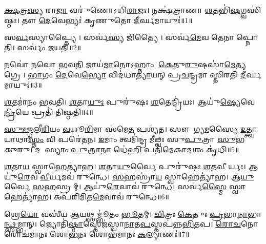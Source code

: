 
\ul{𑌕𑍍𑌷}𑌤𑍍𑌰\ul{𑌸𑍍𑌯} 𑌰𑌾\ul{𑌜𑌾} 𑌵𑌰𑍁॑𑌣𑍋𑌽𑌧𑌿\ul{𑌰𑌾}𑌜𑌃। 𑌨𑌕𑍍𑌷॑𑌤𑍍𑌰𑌾𑌣𑌾 \ul{𑌶}𑌤𑌭𑌿॑\ul{𑌷}𑌗𑍍𑌵𑌸𑌿॑𑌷𑍍𑌠𑌃। 𑌤𑍗 \ul{𑌦𑍇}𑌵𑍇𑌭𑍍𑌯𑌃॑ 𑌕𑍃𑌣𑍁𑌤𑍋 \ul{𑌦𑍀}𑌰𑍍𑌘𑌮𑌾𑌯𑍁𑌃॑॥1॥

𑌸\ul{𑌰𑍍𑌵}𑌸𑍍𑌯𑌾𑌪𑍍𑌤𑍍𑌯𑍈। 𑌸𑌰𑍍𑌵॑\ul{𑌸𑍍𑌯} 𑌜𑌿𑌤𑍍𑌯𑍈। 𑌸𑌰𑍍𑌵॑\ul{𑌮𑍇}𑌵 𑌤𑍇𑌨𑌾𑌪𑍍𑌨𑍋𑌤𑌿। 𑌸𑌰𑍍𑌵𑌂॑ 𑌜𑌯𑌤𑌿॥2॥

𑌨𑌵𑍋॑ 𑌨𑌵𑍋 𑌭𑌵\ul{𑌤𑌿} 𑌜𑌾𑌯॑\ul{𑌮𑌾}𑌨𑍋𑌽𑌹𑍍𑌨𑌾𑌂 \ul{𑌕𑍇}𑌤𑍁\ul{𑌰𑍁}𑌷𑌸𑌾॑\ul{𑌮𑍇}𑌤𑍍𑌯𑌗𑍍𑌰𑍇।
\ul{𑌭𑌾}𑌗𑌂 \ul{𑌦𑍇}𑌵𑍇\ul{𑌭𑍍𑌯𑍋} 𑌵𑌿𑌦॑𑌧𑌾\ul{𑌤𑍍𑌯𑌾}𑌯𑌨𑍍 𑌪𑍍𑌰\ul{𑌚}𑌨𑍍𑌦𑍍𑌰𑌮𑌾𑌸𑍍𑌤𑌿𑌰𑌤𑌿 \ul{𑌦𑍀}𑌰𑍍𑌘𑌮𑌾𑌯𑍁𑌃॑॥3॥

\ul{𑌶}𑌤𑌮𑌾॑𑌨𑌂 𑌭𑌵𑌤𑌿। \ul{𑌶}𑌤𑌾\ul{𑌯𑍁𑌃} 𑌪𑍁𑌰𑍁॑𑌷𑌃 \ul{𑌶}𑌤𑍇𑌨𑍍𑌦𑍍𑌰𑌿॑𑌯𑌃। 𑌆𑌯𑍁॑\ul{𑌷𑍍𑌯𑍇}𑌵𑍇\ul{𑌨𑍍𑌦𑍍𑌰𑌿}𑌯𑍇 𑌪𑍍𑌰𑌤𑌿॑ 𑌤𑌿𑌷𑍍𑌠𑌤𑌿॥4॥

\ul{𑌸𑍁}\ul{𑌮}\ul{𑌙𑍍𑌗}𑌲𑍀\ul{𑌰𑌿}𑌯𑌂 \ul{𑌵}𑌧𑍂\ul{𑌰𑌿}𑌮𑌾 𑌸॑𑌮𑍇\ul{𑌤} 𑌪𑌶𑍍𑌯॑𑌤। 
𑌸𑍗𑌭𑌾᳚𑌗𑍍𑌯\ul{𑌮}𑌸𑍍𑌯𑍈 \ul{𑌦}𑌤𑍍𑌤𑍍𑌵𑌾𑌯𑌾𑌥𑌾\ul{𑌸𑍍𑌤𑌂} 𑌵𑌿 𑌪𑌰𑍇॑𑌤𑌨। 
\ul{𑌇}𑌮𑌾𑌂 𑌤𑍍𑌵𑌮𑌿॑𑌨𑍍𑌦𑍍𑌰 𑌮𑍀𑌢𑍍𑌵𑌃 𑌸𑍁\ul{𑌪𑍁}𑌤𑍍𑌰𑌾 \ul{𑌸𑍁}𑌭𑌗𑌾𑌂᳚ 𑌕𑍁𑌰𑍁। 
𑌦𑌶𑌾᳚𑌸𑍍𑌯𑌾𑌂 \ul{𑌪𑍁}𑌤𑍍𑌰𑌾𑌨𑌾 𑌧𑍇॑\ul{𑌹𑌿} 𑌪𑌤𑌿॑𑌮𑍇𑌕𑌾\ul{𑌦}𑌶𑌂 𑌕𑍃॑𑌧𑌿॥5॥ 


\ul{𑌶}𑌤𑌾\ul{𑌯} 𑌸𑍍𑌵𑌾𑌹𑍇𑌤𑍍𑌯𑌾॑𑌹। \ul{𑌶}𑌤𑌾\ul{𑌯𑍁}𑌰𑍍𑌵𑍈 𑌪𑍁𑌰𑍁॑𑌷𑌃 \ul{𑌶}𑌤𑌵𑍀𑌰𑍍𑌯𑌃। 𑌆𑌯𑍁॑\ul{𑌰𑍇}𑌵 \ul{𑌵𑍀}𑌰𑍍𑌯॑𑌮𑌵॑ 𑌰𑍁𑌨𑍍𑌧𑍇। \ul{𑌸}𑌹𑌸𑍍𑌰𑌾॑\ul{𑌯} 𑌸𑍍𑌵𑌾𑌹𑍇𑌤𑍍𑌯𑌾॑𑌹। 𑌆\ul{𑌯𑍁}𑌰𑍍𑌵𑍈 \ul{𑌸}𑌹𑌸𑍍𑌰𑌮𑍍। 𑌆𑌯𑍁॑\ul{𑌰𑍇}𑌵𑌾𑌵॑ 𑌰𑍁𑌨𑍍𑌧𑍇। 𑌸𑌰𑍍𑌵॑\ul{𑌸𑍍𑌮𑍈} 𑌸𑍍𑌵𑌾𑌹𑍇𑌤𑍍𑌯𑌾॑𑌹। 𑌅𑌪॑𑌰𑌿𑌮𑌿𑌤\ul{𑌮𑍇}𑌵𑌾𑌵॑ 𑌰𑍁𑌨𑍍𑌧𑍇॥6॥


𑌶𑍍𑌰𑍇\ul{𑌯𑍋} 𑌵𑌸𑍀॑𑌯 \ul{𑌆}𑌯𑌥𑍍𑌸𑌮𑍍𑌭𑍂॑𑌤𑌂 \ul{𑌭𑍂}𑌤𑌮𑍍। 
\ul{𑌚𑌿}𑌤𑍍𑌰𑌃 \ul{𑌕𑍇}𑌤𑍁𑌃 \ul{𑌪𑍍𑌰}𑌭𑌾\ul{𑌨𑌾}𑌭𑌾\ul{𑌨𑍍𑌥𑍍𑌸}𑌮𑍍𑌭𑌾𑌨𑍍। 
𑌜𑍍𑌯𑍋𑌤𑌿॑\ul{𑌷𑍍𑌮𑌾}\ul{}𑌸𑍍𑌤𑍇𑌜॑𑌸𑍍𑌵𑌾\ul{𑌨𑌾}𑌤\ul{𑌪}\ul{}𑌸𑍍𑌤𑌪॑𑌨𑍍𑌨\ul{𑌭𑌿}\-𑌤𑌪\sn{}। 
\ul{𑌰𑍋}\ul{𑌚}𑌨𑍋 𑌰𑍋𑌚॑𑌮𑌾𑌨𑌃 𑌶𑍋\ul{𑌭}𑌨𑌃 𑌶𑍋𑌭॑𑌮𑌾𑌨𑌃 \ul{𑌕}𑌲𑍍𑌯𑌾𑌣𑌃॑॥7॥

